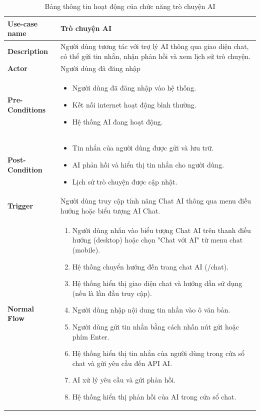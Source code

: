\begin{longtable}{|>{\bfseries}m{4cm}|m{10cm}|}
    \caption{Bảng thông tin hoạt động của chức năng trò chuyện AI}
    \label{table:usecase-chat-ai}\\
\hline
Use-case name & Trò chuyện AI \\
\hline
Description & Người dùng tương tác với trợ lý AI thông qua giao diện chat, có thể gửi tin nhắn, nhận phản hồi và xem lịch sử trò chuyện. \\
\hline
Actor & Người dùng đã đăng nhập \\
\hline
Pre-Conditions & 
\begin{itemize}
    \item Người dùng đã đăng nhập vào hệ thống.
    \item Kết nối internet hoạt động bình thường.
    \item Hệ thống AI đang hoạt động.
\end{itemize} \\
\hline
Post-Condition & 
\begin{itemize}
    \item Tin nhắn của người dùng được gửi và lưu trữ.
    \item AI phản hồi và hiển thị tin nhắn cho người dùng.
    \item Lịch sử trò chuyện được cập nhật.
\end{itemize} \\
\hline
Trigger & Người dùng truy cập tính năng Chat AI thông qua menu điều hướng hoặc biểu tượng AI Chat. \\
\hline
Normal Flow &
\begin{enumerate}
    \item Người dùng nhấn vào biểu tượng Chat AI trên thanh điều hướng (desktop) hoặc chọn "Chat với AI" từ menu chat (mobile).
    \item Hệ thống chuyển hướng đến trang chat AI (/chat).
    \item Hệ thống hiển thị giao diện chat và hướng dẫn sử dụng (nếu là lần đầu truy cập).
    \item Người dùng nhập nội dung tin nhắn vào ô văn bản.
    \item Người dùng gửi tin nhắn bằng cách nhấn nút gửi hoặc phím Enter.
    \item Hệ thống hiển thị tin nhắn của người dùng trong cửa sổ chat và gửi yêu cầu đến API AI.
    \item AI xử lý yêu cầu và gửi phản hồi.
    \item Hệ thống hiển thị phản hồi của AI trong cửa sổ chat.

\end{enumerate}
\end{longtable}
